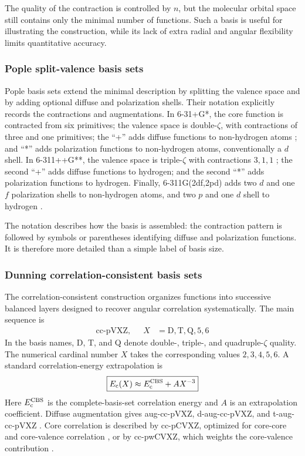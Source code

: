 The quality of the contraction is controlled by $n$, but the molecular
orbital space still contains only the minimal number of functions. Such a
basis is useful for illustrating the construction, while its lack of extra
radial and angular flexibility limits quantitative accuracy.

\subsubsection{Pople split-valence basis sets}

Pople basis sets \citep{Hehre1972} extend the minimal description by splitting the valence space
and by adding optional diffuse and polarization shells. Their notation
explicitly records the contractions and augmentations. In
6-31+G*, the core function is contracted from six primitives; the valence
space is double-$\zeta$, with contractions of three and one primitives; the
``+'' adds diffuse functions to non-hydrogen atoms \citep{Clark1983}; and ``*'' adds polarization
functions to non-hydrogen atoms, conventionally a $d$ shell. In 6-311++G**,
the valence space is triple-$\zeta$ with contractions $3,1,1$ \citep{Krishnan1980}; the second
``+'' adds diffuse functions to hydrogen; and the second ``*'' adds
polarization functions to hydrogen. Finally, 6-311G(2df,2pd) adds two $d$ and
one $f$ polarization shells to non-hydrogen atoms, and two $p$ and one $d$
shell to hydrogen \citep{Frisch1984}.

The notation describes how the basis is assembled: the contraction pattern is
followed by symbols or parentheses identifying diffuse and polarization
functions. It is therefore more detailed than a simple label of basis size.

\subsubsection{Dunning correlation-consistent basis sets}

\hfBioDunning

The correlation-consistent construction \citep{Dunning1989} organizes functions into successive
balanced layers designed to recover angular correlation systematically. The
main sequence is
\begin{align}
  \text{cc-pVXZ},&& X&=\mathrm{D,T,Q,5,6}
\end{align}
In the basis names, D, T, and Q denote double-, triple-, and quadruple-$\zeta$
quality. The numerical cardinal number $X$ takes the corresponding values
$2,3,4,5,6$. A standard correlation-energy extrapolation
\citep{Helgaker1997} is
\begin{equation}
  \boxed{
  E_\text{c}(X)\approx E_\text{c}^\text{CBS}+AX^{-3}
  }
\end{equation}
Here $E_\text{c}^\text{CBS}$ is the complete-basis-set correlation energy and $A$
is an extrapolation coefficient.
Diffuse augmentation gives aug-cc-pVXZ, d-aug-cc-pVXZ, and t-aug-cc-pVXZ
\citep{Kendall1992}.
Core correlation is described by cc-pCVXZ, optimized for core-core and
core-valence correlation \citep{Woon1995}, or by cc-pwCVXZ, which weights the core-valence
contribution \citep{Peterson2002}.


